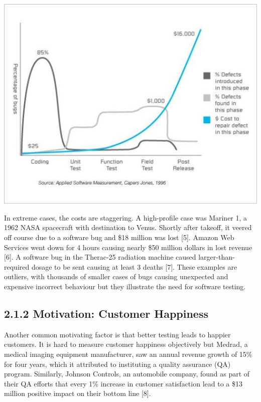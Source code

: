 \documentclass[12pt]{report}
\begin{document}
\begin{center}
\includegraphics[scale=0.7]{cost-test}
\end{center}
\par\noindent
In extreme cases, the costs are staggering. A high-profile case was Mariner 1, a 1962 NASA spacecraft with destination to Venus. Shortly after takeoff, it veered off course due to a software bug and \$18 million was lost [5]. Amazon Web Services went down for 4 hours causing nearly \$50 million dollars in lost revenue [6]. A software bug in the Therac-25 radiation machine caused larger-than-required dosage to be sent causing at least 3 deaths [7]. These examples are outliers, with thousands of smaller cases of bugs causing unexpected and expensive incorrect behaviour but they illustrate the need for software testing.

\subsection*{2.1.2 Motivation: Customer Happiness}
\par\noindent
Another common motivating factor is that better testing leads to happier customers. It is hard to measure customer happiness objectively but Medrad, a medical imaging equipment manufacturer, saw an annual revenue growth of 15\% for four years, which it attributed to instituting a quality assurance (QA) program. Similarly, Johnson Controls, an automobile company, found as part of their QA efforts that every 1\% increase in customer satisfaction lead to a \$13 million positive impact on their bottom line [8].
\end{document}
